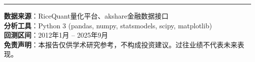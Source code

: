 \documentclass[10pt,a4paper]{ctexart}
\begin{document}
\vspace{1cm}

\noindent\rule{\textwidth}{0.5pt}
\small
\textbf{数据来源}：RiceQuant量化平台、akshare金融数据接口\\
\textbf{分析工具}：Python 3 (pandas, numpy, statsmodels, scipy, matplotlib)\\
\textbf{回测区间}：2012年1月 -- 2025年9月\\
\textbf{免责声明}：本报告仅供学术研究参考，不构成投资建议。过往业绩不代表未来表现。
\end{document}
